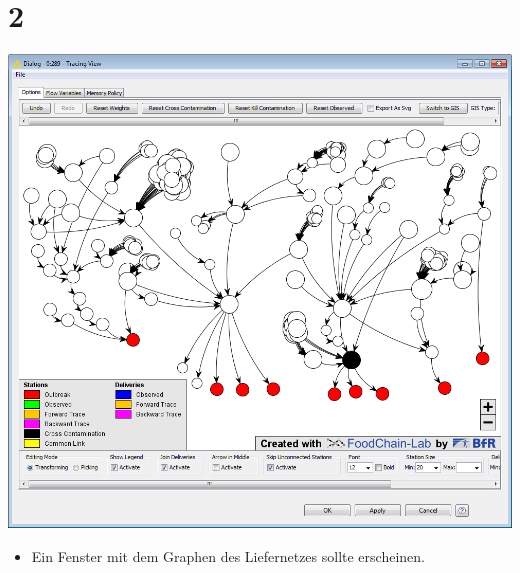 \documentclass{beamer}
\begin{document}
\section{2}
\begin{frame}
	\begin{center}
  		\includegraphics[height=0.6\textheight]{2.png}
	\end{center}
	\begin{itemize}
		\item Ein Fenster mit dem Graphen des Liefernetzes sollte erscheinen.
	\end{itemize}
\end{frame}
\end{document}
